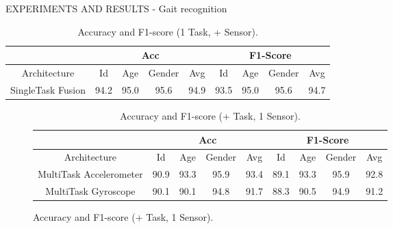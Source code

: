 \documentclass[10pt]{beamer}
\begin{document}
\begin{frame}{EXPERIMENTS AND RESULTS - Gait recognition}
\begin{minipage}{\linewidth}
\begin{minipage}{0.45\linewidth}
\begin{table}[h!]
\begin{adjustbox}{max width=\textwidth}
                \begin{tabular}{|c||ccc|c||ccc|c|}
                    \hline
                        & \multicolumn{4}{c||}{Acc} & \multicolumn{4}{c|}{F1-Score} \\
                    \hline
                        Architecture & Id & Age & Gender & Avg & Id & Age & Gender & Avg\\
                    \hline
                        SingleTask Fusion & 94.2 & 95.0 & 95.6 & 94.9 & 93.5 & 95.0 & 95.6 & 94.7\\
                    \hline 
                \end{tabular}
                \end{adjustbox}
                \caption{Accuracy and F1-score (1 Task, + Sensor).}
                \label{table accuracy and F1 (1 Task, + Sensor)}
            \end{table}
        \end{minipage}
        \hspace{0.05\linewidth}
        \begin{minipage}{0.45\linewidth}
            \begin{figure}[htbp]
                \centering
                \begin{table}[h!]
                    \centering
                    \begin{adjustbox}{max width=\textwidth}
                    \begin{tabular}{|c||ccc|c||ccc|c|}
                        \hline
                            & \multicolumn{4}{c||}{Acc} & \multicolumn{4}{c|}{F1-Score} \\
                        \hline
                            Architecture & Id & Age & Gender & Avg & Id & Age & Gender & Avg\\
                        \hline
                            MultiTask Accelerometer & 90.9 & 93.3 & 95.9 & 93.4 & 89.1 & 93.3 & 95.9 & 92.8\\
                            MultiTask Gyroscope & 90.1 & 90.1 & 94.8 & 91.7 & 88.3 & 90.5 & 94.9 & 91.2\\
                        \hline 
                    \end{tabular}
                    \end{adjustbox}
                    \caption{Accuracy and F1-score (+ Task, 1 Sensor).}
                    \label{table accuracy and F1 (more Task - 1 Sensor)}
                \end{table}

\end{figure}
\end{minipage}
\end{minipage}
\end{frame}
\end{document}
